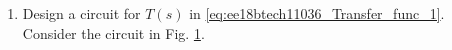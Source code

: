 \begin{enumerate}[label=\arabic*.,ref=\theenumi]
\item Design a circuit for $T(s)$ in \eqref{eq:ee18btech11036_Transfer_func_1}.
\\
\solution Consider the circuit in 
Fig. \ref{fig:ee18btech11036_equivalent_control_system}.
\renewcommand{\thefigure}{\theenumi.\arabic{figure}}
\begin{figure}[!hbt]
	\begin{center}
			\resizebox{\columnwidth}{!}{}
	\end{center}
\caption{}
\label{fig:ee18btech11036_equivalent_control_system}
\end{figure}
%

\end{enumerate}
